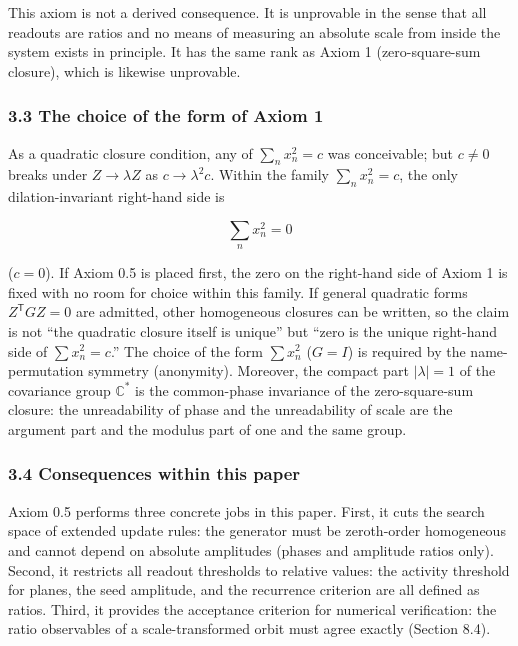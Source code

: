 \documentclass[
  a4paper,
]{article}
\begin{document}
This axiom is not a derived consequence. It is unprovable in the sense
that all readouts are ratios and no means of measuring an absolute scale
from inside the system exists in principle. It has the same rank as
Axiom 1 (zero-square-sum closure), which is likewise unprovable.

\subsubsection{3.3 The choice of the form of Axiom
1}\label{the-choice-of-the-form-of-axiom-1}

As a quadratic closure condition, any of \(\sum_n x_n^2=c\) was
conceivable; but \(c\ne0\) breaks under \(Z\to\lambda Z\) as
\(c\to\lambda^2c\). Within the family \(\sum_n x_n^2=c\), the only
dilation-invariant right-hand side is

\[
\sum_n x_n^2=0
\]

(\(c=0\)). If Axiom 0.5 is placed first, the zero on the right-hand side
of Axiom 1 is fixed with no room for choice within this family. If
general quadratic forms \(Z^{\mathsf T}GZ=0\) are admitted, other
homogeneous closures can be written, so the claim is not ``the quadratic
closure itself is unique'' but ``zero is the unique right-hand side of
\(\sum x_n^2=c\).'' The choice of the form \(\sum x_n^2\) (\(G=I\)) is
required by the name-permutation symmetry (anonymity). Moreover, the
compact part \(|\lambda|=1\) of the covariance group \(\mathbb C^\ast\)
is the common-phase invariance of the zero-square-sum closure: the
unreadability of phase and the unreadability of scale are the argument
part and the modulus part of one and the same group.

\subsubsection{3.4 Consequences within this
paper}\label{consequences-within-this-paper}

Axiom 0.5 performs three concrete jobs in this paper. First, it cuts the
search space of extended update rules: the generator must be
zeroth-order homogeneous and cannot depend on absolute amplitudes
(phases and amplitude ratios only). Second, it restricts all readout
thresholds to relative values: the activity threshold for planes, the
seed amplitude, and the recurrence criterion are all defined as ratios.
Third, it provides the acceptance criterion for numerical verification:
the ratio observables of a scale-transformed orbit must agree exactly
(Section 8.4).
\end{document}
